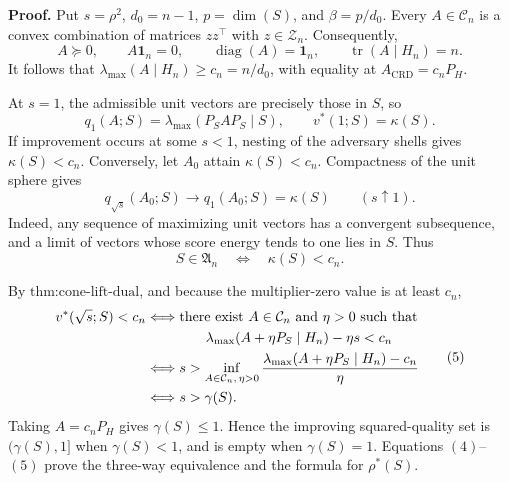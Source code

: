 \textbf{Proof.}
Put \(s=\rho^2\), \(d_0=n-1\), \(p=\dim(S)\), and \(\beta=p/d_0\).  Every \(A\in\mathcal C_n\) is a convex combination of matrices \(zz^\top\) with \(z\in\mathcal Z_n\).  Consequently,
\[
A\succeq0,
\qquad
A\mathbf1_n=0,
\qquad
\operatorname{diag}(A)=\mathbf1_n,
\qquad
\operatorname{tr}(A\mid H_n)=n.
\tag{1}
\]
It follows that \(\lambda_{\max}(A\mid H_n)\geq c_n=n/d_0\), with equality at \(A_{\mathrm{CRD}}=c_nP_H\).

At \(s=1\), the admissible unit vectors are precisely those in \(S\), so
\[
q_1(A;S)=\lambda_{\max}(P_SAP_S\mid S),
\qquad
v^*(1;S)=\kappa(S).
\tag{2}
\]
If improvement occurs at some \(s<1\), nesting of the adversary shells gives \(\kappa(S)<c_n\).  Conversely, let \(A_0\) attain \(\kappa(S)<c_n\).  Compactness of the unit sphere gives
\[
q_{\sqrt{s}}(A_0;S)\longrightarrow q_1(A_0;S)=\kappa(S)
\qquad(s\uparrow1).
\tag{3}
\]
Indeed, any sequence of maximizing unit vectors has a convergent subsequence, and a limit of vectors whose score energy tends to one lies in \(S\).  Thus
\[
S\in\mathfrak A_n
\quad\Longleftrightarrow\quad
\kappa(S)<c_n.
\tag{4}
\]

By \(\text{thm:cone-lift-dual}\), and because the multiplier-zero value is at least \(c_n\),
\[
\begin{aligned}
v^*(\sqrt{s};S)<c_n
&\Longleftrightarrow
\text{there exist }A\in\mathcal C_n\text{ and }\eta>0\text{ such that}\\
&\hspace{1.5cm}
\lambda_{\max}(A+\eta P_S\mid H_n)-\eta s<c_n\\
&\Longleftrightarrow
s>\inf_{A\in\mathcal C_n,\,\eta>0}
\frac{\lambda_{\max}(A+\eta P_S\mid H_n)-c_n}{\eta}\\
&\Longleftrightarrow s>\gamma(S).
\end{aligned}
\tag{5}
\]
Taking \(A=c_nP_H\) gives \(\gamma(S)\leq1\).  Hence the improving squared-quality set is \((\gamma(S),1]\) when \(\gamma(S)<1\), and is empty when \(\gamma(S)=1\).  Equations \((4)\)--\((5)\) prove the three-way equivalence and the formula for \(\rho^*(S)\).

